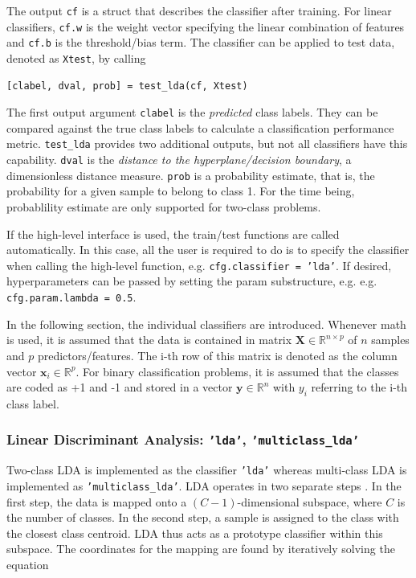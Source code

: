 \documentclass[utf8]{frontiersSCNS} %
\newcommand{\x}{\mathbf{x}}
\newcommand{\R}{\mathbb{R}}
\newcommand{\X}{\mathbf{X}}
\newcommand{\ttt}[1]{\texttt{#1}}
\begin{document}
The output \ttt{cf} is a struct that describes the classifier after training. For linear classifiers, \ttt{cf.w} is the weight vector specifying the linear combination of features and \ttt{cf.b} is the threshold/bias term. The classifier can be applied to test data, denoted as \ttt{Xtest}, by calling

\begin{verbatim}
[clabel, dval, prob] = test_lda(cf, Xtest)
\end{verbatim}

The first output argument \ttt{clabel} is the \textit{predicted} class labels. They can be compared against the true class labels to calculate a classification performance metric. \ttt{test\_lda} provides two additional outputs, but not all classifiers have this capability. \ttt{dval} is the \textit{distance to the hyperplane/decision boundary}, a dimensionless distance measure. \ttt{prob} is a probability estimate, that is, the probability for a given sample to belong to class 1. For the time being, probablility estimate are only supported for two-class problems.

If the high-level interface is used, the train/test functions are called  automatically. In this case, all the user is required to do is to specify the classifier when calling the high-level function, e.g. \ttt{cfg.classifier = 'lda'}. If desired, hyperparameters can be passed by setting the param substructure, e.g.  e.g. \ttt{cfg.param.lambda = 0.5}.

In the following section, the individual classifiers are introduced. Whenever math is used, it is assumed that the data is contained in matrix $\X\in\R^{n \times p}$ of $n$ samples and $p$ predictors/features. The i-th row of this matrix is denoted as the column vector $\x_i\in\R^p$. For binary classification problems, it is assumed that the classes are coded as +1 and -1 and stored in a vector $\mathbf{y}\in\R^n$ with $y_i$ referring to the i-th class label.

\subsubsection{Linear Discriminant Analysis: \ttt{'lda'}, \ttt{'multiclass\_lda'}}

Two-class LDA is implemented as the classifier \ttt{'lda'} whereas multi-class LDA is implemented as \texttt{'multiclass\_lda'}. LDA operates in two separate steps \citep{Fisher1936}. In the first step, the data is mapped onto a $(C-1)$-dimensional subspace, where $C$ is the number of classes. In the second step, a sample is assigned to the class with the closest class centroid. LDA thus acts as a prototype classifier within this subspace. The coordinates for the mapping are found by iteratively solving the equation
\end{document}

